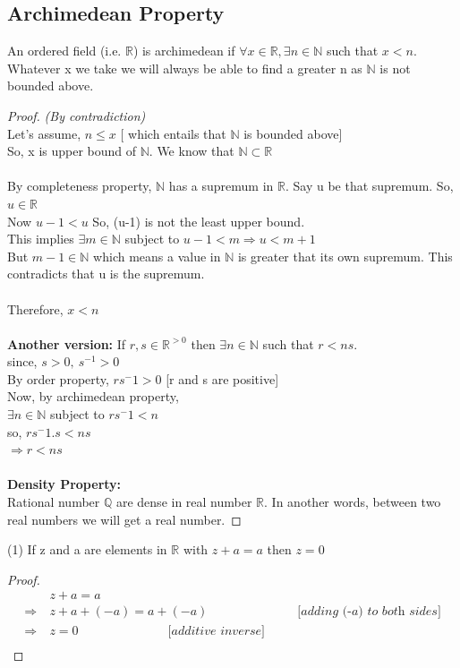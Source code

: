 \documentclass{article}
\newcommand{\Rw}{\Rightarrow}
\newcommand{\hs}{\hspace}
\begin{document}
\subsection{Archimedean Property}
An ordered field (i.e. $\mathbb{R}$) is archimedean if $\forall x \in \mathbb{R}, \exists n \in \mathbb{N}$ such that $x<n$. Whatever x we take we will always be able to find a greater n as $\mathbb{N}$ is not bounded above.
\begin{proof}
    \textit{(By contradiction)} \\
    Let's assume, $n\leq x$ [ which entails that $\mathbb{N}$ is bounded above]\\
    So, x is upper bound of $\mathbb{N}$. We know that $\mathbb{N} \subset \mathbb{R}$\\\\
    By completeness property, $\mathbb{N}$ has a supremum in $\mathbb{R}$. Say u be that supremum. So, $u \in \mathbb{R}$\\
    Now $u-1<u$ So, (u-1) is not the least upper bound. \\
    This implies $\exists m \in \mathbb{N}$ subject to $u-1<m \Rw u<m+1$\\
    But $m-1 \in \mathbb{N}$ which means a value in $\mathbb{N}$ is greater that its own supremum. This contradicts that u is the supremum. \\\\
    Therefore, $x<n$
\\\\
\textbf{Another version: } If $r,s \in \mathbb{R}^{>0} $ then $\exists n \in \mathbb{N}$ such that $r<ns$. \\
since, $s>0,\ s^{-1}>0$\\
By order property, $rs^-1>0$  [r and s are positive]\\
Now, by archimedean property,\\
$\exists n \in \mathbb{N}$ subject to $rs^-1<n$\\
so, $rs^-1.s<ns$\\
$\Rw r < ns$
\\\\
\textbf{Density Property:}\\
Rational number $\mathbb{Q}$ are dense in real number $\mathbb{R}$. In another words, between two real numbers we will get a real number. 
\end{proof}
\begin{theorem}{(1)}{}
    If z and a are elements in $\mathbb{R}$ with $z+a=a$ then $z=0$
    \begin{proof}
        \begin{align*}
            & z+a=a\\
            \Rw \ & z+a+(-a)=a+(-a)\hs{3cm}\textit{[adding (-a) to both sides]}\\
            \Rw \ & z=0 \hs{3cm}\textit{[additive inverse]}\\
        \end{align*}
    \end{proof}
\end{theorem}
\end{document}
